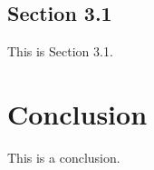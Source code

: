 \documentclass[letterpaper,12pt]{article}
\begin{document}
\subsection{Section 3.1}
This is Section 3.1.

\section{Conclusion}
This is a conclusion.


\renewcommand{\bibname}{References}
\printbibliography


\vspace{.25in}
\end{document}
